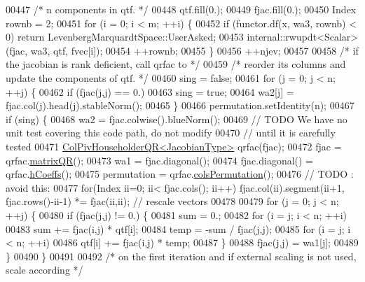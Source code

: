 \begin{DoxyCode}
00447     \textcolor{comment}{/* n components in qtf. */}
00448     qtf.fill(0.);
00449     fjac.fill(0.);
00450     Index rownb = 2;
00451     \textcolor{keywordflow}{for} (i = 0; i < m; ++i) \{
00452         \textcolor{keywordflow}{if} (functor.df(x, wa3, rownb) < 0) \textcolor{keywordflow}{return} LevenbergMarquardtSpace::UserAsked;
00453         internal::rwupdt<Scalar>(fjac, wa3, qtf, fvec[i]);
00454         ++rownb;
00455     \}
00456     ++njev;
00457 
00458     \textcolor{comment}{/* if the jacobian is rank deficient, call qrfac to */}
00459     \textcolor{comment}{/* reorder its columns and update the components of qtf. */}
00460     sing = \textcolor{keyword}{false};
00461     \textcolor{keywordflow}{for} (j = 0; j < n; ++j) \{
00462         \textcolor{keywordflow}{if} (fjac(j,j) == 0.)
00463             sing = \textcolor{keyword}{true};
00464         wa2[j] = fjac.col(j).head(j).stableNorm();
00465     \}
00466     permutation.setIdentity(n);
00467     \textcolor{keywordflow}{if} (sing) \{
00468         wa2 = fjac.colwise().blueNorm();
00469         \textcolor{comment}{// TODO We have no unit test covering this code path, do not modify}
00470         \textcolor{comment}{// until it is carefully tested}
00471         \hyperlink{group___q_r___module_class_eigen_1_1_col_piv_householder_q_r}{ColPivHouseholderQR<JacobianType>} qrfac(fjac);
00472         fjac = qrfac.\hyperlink{group___q_r___module_aa572ac050c8d4fadd4f08a87f6b1e62b}{matrixQR}();
00473         wa1 = fjac.diagonal();
00474         fjac.diagonal() = qrfac.\hyperlink{group___q_r___module_ac5943d19aa5fd96340c7df6874fcb1b9}{hCoeffs}();
00475         permutation = qrfac.\hyperlink{group___q_r___module_ab6ad43e6a6fb75726eae0d5499948f4a}{colsPermutation}();
00476         \textcolor{comment}{// TODO : avoid this:}
00477         \textcolor{keywordflow}{for}(Index ii=0; ii< fjac.cols(); ii++) fjac.col(ii).segment(ii+1, fjac.rows()-ii-1) *= fjac(ii,ii);
       \textcolor{comment}{// rescale vectors}
00478 
00479         \textcolor{keywordflow}{for} (j = 0; j < n; ++j) \{
00480             \textcolor{keywordflow}{if} (fjac(j,j) != 0.) \{
00481                 sum = 0.;
00482                 \textcolor{keywordflow}{for} (i = j; i < n; ++i)
00483                     sum += fjac(i,j) * qtf[i];
00484                 temp = -sum / fjac(j,j);
00485                 \textcolor{keywordflow}{for} (i = j; i < n; ++i)
00486                     qtf[i] += fjac(i,j) * temp;
00487             \}
00488             fjac(j,j) = wa1[j];
00489         \}
00490     \}
00491 
00492     \textcolor{comment}{/* on the first iteration and if external scaling is not used, scale according */}

\end{DoxyCode}
